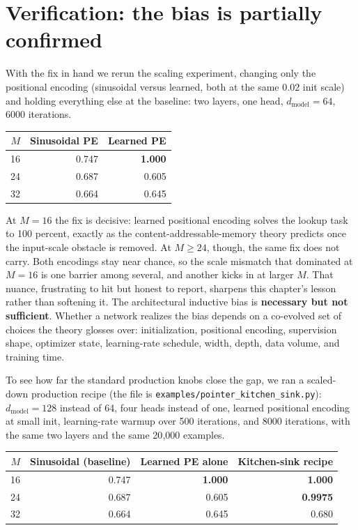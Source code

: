 \section{Verification: the bias is partially confirmed}\label{sec:partial-confirmation}

With the fix in hand we rerun the scaling experiment, changing only the
positional encoding (sinusoidal versus learned, both at the same $0.02$ init
scale) and holding everything else at the baseline: two layers, one head,
$d_{\text{model}}=64$, 6000 iterations.

\begin{center}
\begin{tabular}{@{}rrr@{}}
\toprule
$M$ & Sinusoidal PE & Learned PE \\
\midrule
16 & 0.747 & \textbf{1.000} \\
24 & 0.687 & 0.605 \\
32 & 0.664 & 0.645 \\
\bottomrule
\end{tabular}
\end{center}

At $M=16$ the fix is decisive: learned positional encoding solves the lookup
task to 100 percent, exactly as the content-addressable-memory theory predicts
once the input-scale obstacle is removed. At $M \geq 24$, though, the same fix
does not carry. Both encodings stay near chance, so the scale mismatch that
dominated at $M=16$ is one barrier among several, and another kicks in at
larger $M$. That nuance, frustrating to hit but honest to report, sharpens
this chapter's lesson rather than softening it. The architectural inductive
bias is \textbf{necessary but not sufficient}. Whether a network realizes the
bias depends on a co-evolved set of choices the theory glosses over:
initialization, positional encoding, supervision shape, optimizer state,
learning-rate schedule, width, depth, data volume, and training time.

To see how far the standard production knobs close the gap, we ran a
scaled-down production recipe (the file is
\texttt{examples/pointer\_kitchen\_sink.py}): $d_{\text{model}}=128$ instead
of 64, four heads instead of one, learned positional encoding at small init,
learning-rate warmup over 500 iterations, and 8000 iterations, with the same
two layers and the same 20{,}000 examples.

\begin{center}
\begin{tabular}{@{}rrrr@{}}
\toprule
$M$ & Sinusoidal (baseline) & Learned PE alone & Kitchen-sink recipe \\
\midrule
16 & 0.747 & \textbf{1.000} & \textbf{1.000} \\
24 & 0.687 & 0.605 & \textbf{0.9975} \\
32 & 0.664 & 0.645 & 0.680 \\
\bottomrule
\end{tabular}
\end{center}

